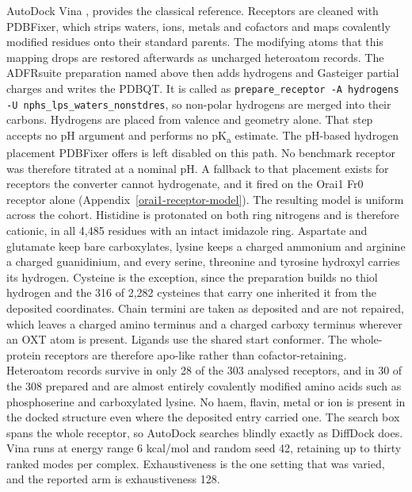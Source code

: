 AutoDock Vina \cite{ref022}, \cite{ref023} provides the classical reference. Receptors are cleaned with PDBFixer, which strips waters, ions, metals and cofactors and maps covalently modified residues onto their standard parents. The modifying atoms that this mapping drops are restored afterwards as uncharged heteroatom records. The ADFRsuite preparation named above then adds hydrogens and Gasteiger partial charges and writes the PDBQT. It is called as \texttt{prepare\_receptor -A hydrogens -U nphs\_lps\_waters\_nonstdres}, so non-polar hydrogens are merged into their carbons. Hydrogens are placed from valence and geometry alone. That step accepts no pH argument and performs no pK\textsubscript{a} estimate. The pH-based hydrogen placement PDBFixer offers is left disabled on this path. No benchmark receptor was therefore titrated at a nominal pH. A fallback to that placement exists for receptors the converter cannot hydrogenate, and it fired on the Orai1 Fr0 receptor alone (Appendix~\ref{orai1-receptor-model}). The resulting model is uniform across the cohort. Histidine is protonated on both ring nitrogens and is therefore cationic, in all 4,485 residues with an intact imidazole ring. Aspartate and glutamate keep bare carboxylates, lysine keeps a charged ammonium and arginine a charged guanidinium, and every serine, threonine and tyrosine hydroxyl carries its hydrogen. Cysteine is the exception, since the preparation builds no thiol hydrogen and the 316 of 2,282 cysteines that carry one inherited it from the deposited coordinates. Chain termini are taken as deposited and are not repaired, which leaves a charged amino terminus and a charged carboxy terminus wherever an OXT atom is present. Ligands use the shared start conformer. The whole-protein receptors are therefore apo-like rather than cofactor-retaining. Heteroatom records survive in only 28 of the 303 analysed receptors, and in 30 of the 308 prepared and are almost entirely covalently modified amino acids such as phosphoserine and carboxylated lysine. No haem, flavin, metal or ion is present in the docked structure even where the deposited entry carried one. The search box spans the whole receptor, so AutoDock searches blindly exactly as DiffDock does. Vina runs at energy range 6 kcal/mol and random seed 42, retaining up to thirty ranked modes per complex. Exhaustiveness is the one setting that was varied, and the reported arm is exhaustiveness 128.


